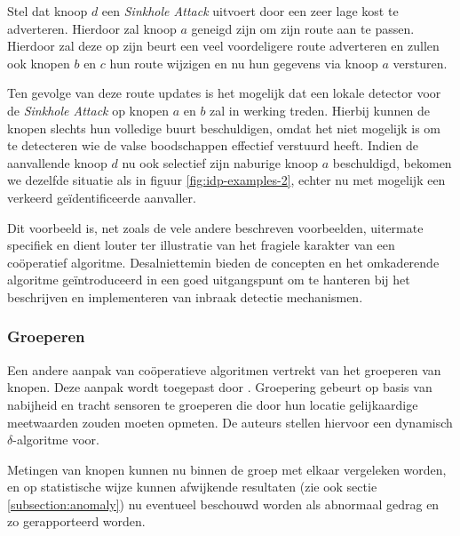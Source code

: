 Stel dat knoop $d$ een \emph{Sinkhole Attack} uitvoert door een zeer lage kost
te adverteren. Hierdoor zal knoop $a$ geneigd zijn om zijn route aan te passen.
Hierdoor zal deze op zijn beurt een veel voordeligere route adverteren en
zullen ook knopen $b$ en $c$ hun route wijzigen en nu hun gegevens via knoop
$a$ versturen.

Ten gevolge van deze route updates is het mogelijk dat een lokale detector voor
de \emph{Sinkhole Attack} op knopen $a$ en $b$ zal in werking treden. Hierbij
kunnen de knopen slechts hun volledige buurt beschuldigen, omdat het niet
mogelijk is om te detecteren wie de valse boodschappen effectief verstuurd
heeft. Indien de aanvallende knoop $d$ nu ook selectief zijn naburige knoop $a$
beschuldigd, bekomen we dezelfde situatie als in figuur
\ref{fig:idp-examples-2}, echter nu met mogelijk een verkeerd
ge\"identificeerde aanvaller.

Dit voorbeeld is, net zoals de vele andere beschreven voorbeelden, uitermate
specifiek en dient louter ter illustratie van het fragiele karakter van een
co\"operatief algoritme. Desalniettemin bieden de concepten en het omkaderende
algoritme ge\"introduceerd in \citep{krontiris2009cooperative} een goed
uitgangspunt om te hanteren bij het beschrijven en implementeren van inbraak
detectie mechanismen.

\subsubsection*{Groeperen}
\label{subsubsection:grouping}

Een andere aanpak van co\"operatieve algoritmen vertrekt van het groeperen van
knopen. Deze aanpak wordt toegepast door \citep{li2008group}. Groepering gebeurt
op basis van nabijheid en tracht sensoren te groeperen die door hun locatie
gelijkaardige meetwaarden zouden moeten opmeten. De auteurs stellen hiervoor
een dynamisch $\delta$-algoritme voor.

Metingen van knopen kunnen nu binnen de groep met elkaar vergeleken worden, en
op statistische wijze kunnen afwijkende resultaten (zie ook sectie
\ref{subsection:anomaly}) nu eventueel beschouwd worden als abnormaal gedrag en zo
gerapporteerd worden.
